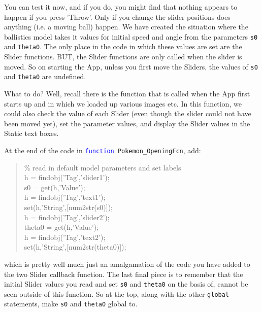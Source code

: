 \documentclass{tufte-book} %
\newenvironment{docspec}{\begin{quotation}\ttfamily\parskip0pt\parindent0pt\ignorespaces}{\end{quotation}}
\begin{document}
You can test it now, and if you do, you might find that nothing appears to happen if you press 'Throw'. Only if you change the slider positions does anything (i.e. a moving ball) happen. We have created the situation where the ballistics model takes it values for initial speed and angle from the parameters \texttt{s0} and \texttt{theta0}. The only place in the code in which these values are set are the \textsf{Slider} functions. BUT, the \textsf{Slider} functions are only called when the slider is moved. So on starting the App, unless you first move the \textsf{Sliders}, the values of \texttt{s0} and \texttt{theta0} are undefined.

What to do? Well, recall there is the function that is called when the App first starts up and in which we loaded up various images etc. In this function, we could also check the value of each \textsf{Slider} (even though the slider could not have been moved yet), set the parameter values, and display the \textsf{Slider} values in the \textsf{Static text} boxes.

At the end of the code in \texttt{\textcolor{blue}{function} Pokemon\_OpeningFcn}, add:
\begin{docspec}
\textcolor[rgb]{0,0.501961,0}{\% read in default model parameters and set labels}
\\h = findobj(\textcolor[rgb]{0.501961,0,1}{'Tag'},\textcolor[rgb]{0.501961,0,1}{'slider1'});
\\s0 = get(h,\textcolor[rgb]{0.501961,0,1}{'Value'});
\\h = findobj(\textcolor[rgb]{0.501961,0,1}{'Tag'},\textcolor[rgb]{0.501961,0,1}{'text1'});
\\set(h,\textcolor[rgb]{0.501961,0,1}{'String'},[num2str(s0)]);
\\h = findobj(\textcolor[rgb]{0.501961,0,1}{'Tag'},\textcolor[rgb]{0.501961,0,1}{'slider2'});
\\theta0 = get(h,\textcolor[rgb]{0.501961,0,1}{'Value'});
\\h = findobj(\textcolor[rgb]{0.501961,0,1}{'Tag'},\textcolor[rgb]{0.501961,0,1}{'text2'});
\\set(h,\textcolor[rgb]{0.501961,0,1}{'String'},[num2str(theta0)]);
\end{docspec}
which is pretty well much just an amalgamation of the code you have added to the two \textsf{Slider} callback function. The last final piece is to remember that the initial Slider values you read and set \texttt{s0} and \texttt{theta0} on the basis of, cannot be seen outside of this function. So at the top, along with the other \texttt{global} statements, make \texttt{s0} and \texttt{theta0} global to.
\end{document}
